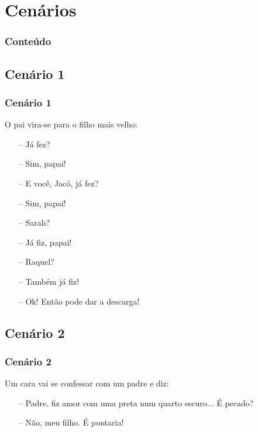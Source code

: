 \documentclass[14pt,beamer]{beamer}
\begin{document}
\section{Cenários}

\begin{frame}
	\frametitle{Conteúdo}
	\footnotesize
\end{frame}

\subsection{Cenário 1}
\begin{frame}
	\frametitle{Cenário 1}

	O pai  vira-se para o filho mais velho:
	\begin{itemize}
		\item[--] Já fez?
		\item[--] Sim, papai!
		\item[--] E você, Jacó, já fez?
		\item[--] Sim, papai!
		\item[--] Sarah?
		\item[--] Já fiz, papai!
		\item[--] Raquel?
		\item[--] Também já fiz!
		\item[--] Ok! Então pode dar a descarga!
	\end{itemize}

\end{frame}

\subsection{Cenário 2}
\begin{frame}
	\frametitle{Cenário 2}

Um cara vai se confessar com um padre e diz:
	\begin{itemize}
		\item[--] Padre, fiz amor com uma preta num quarto escuro... É pecado?
		\item[--]  Não, meu filho. É pontaria!
	\end{itemize}
\end{frame}
\end{document}
